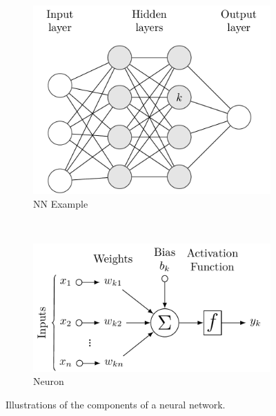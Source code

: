 \begin{figure}[H]
  \centering
  \begin{subfigure}[b]{0.48\textwidth}\centering
      \includegraphics[width=\textwidth]{figures/ml/NN_diagram/NN_diagram.pdf}
  \caption{NN Example}
  \label{fig:NN:ex}
  \end{subfigure}
  ~
  \begin{subfigure}[b]{0.48\textwidth}\centering
      \includegraphics[width=\textwidth]{figures/ml/NN_neuron/NN_neuron.pdf}
  \caption{Neuron}
  \label{fig:NN:Neuron}
  \end{subfigure}
\caption{
Illustrations of the components of a neural network.
\label{fig:NN}
}
\end{figure}
